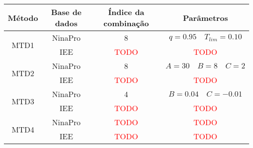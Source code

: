 \begin{table}[htb]
{
	\begin{tabular}{c|ccc}
		\toprule
		Método 					& Base de dados	& Índice da combinação	& Parâmetros \\
		\midrule \midrule
		\multirow{2}{*}{MTD1}	& NinaPro		& 8						& $q = 0.95 \quad T_{lim} = 0.10$\\
								& IEE			& \textcolor{red}{TODO}						& \textcolor{red}{TODO}\\
		\midrule
		\multirow{2}{*}{MTD2}	& NinaPro		& 8						& $A = 30 \quad B = 8 \quad C = 2$\\
								& IEE			& \textcolor{red}{TODO}						& \textcolor{red}{TODO}\\
		\midrule
		\multirow{2}{*}{MTD3}	& NinaPro		& 4						& $B = 0.04 \quad C = -0.01$\\
								& IEE			&\textcolor{red}{TODO} 						&\textcolor{red}{TODO} \\
		\midrule
		\multirow{2}{*}{MTD4}	& NinaPro		& \textcolor{red}{TODO}						&\textcolor{red}{TODO} \\
								& IEE			& \textcolor{red}{TODO}						&\textcolor{red}{TODO} \\
		\midrule
		\bottomrule
	\end{tabular}
}{}
\end{table}

